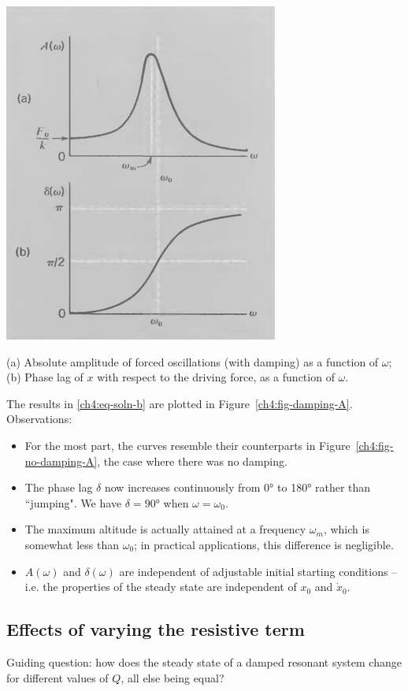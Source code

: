 \begin{marginfigure}
	\centering
	\includegraphics[scale=0.5]{phys232/Ch4-forced-damping-A.png} \caption{(a) Absolute amplitude of forced oscillations (with damping) as a function of $\omega$; (b) Phase lag of $x$ with respect to the driving force, as a function of $\omega$.}	\label{ch4:fig-damping-A}
\end{marginfigure}

The results in \eqref{ch4:eq-soln-b} are plotted in Figure~\ref{ch4:fig-damping-A}. Observations:
\begin{itemize}
	\item For the most part, the curves resemble their counterparts in Figure~\ref{ch4:fig-no-damping-A}, the case where there was no damping.
	\item The phase lag $\delta$ now increases continuously from 0° to 180° rather than ``jumping". We have $\delta=90$° when $\omega=\omega_0$.
	\item The maximum altitude is actually attained at a frequency $\omega_m$, which is somewhat less than $\omega_0$; in practical applications, this difference is negligible.
	\item $A(\omega)$ and $\delta(\omega)$ are independent of adjustable initial starting conditions -- i.e. the properties of the steady state are independent of $x_0$ and $\dot{x}_0$.
\end{itemize}

\subsection{Effects of varying the resistive term}
Guiding question: how does the steady state of a damped resonant system change for different values of $Q$, all else being equal?

